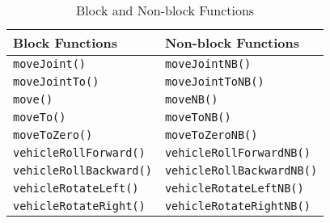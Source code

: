 \begin{center}
\begin{table}[!h]
\caption{Block and Non-block Functions\label{tab:block_nonblock}}
\begin{tabular}{ p{7cm}p{7cm} }\hline
Block Functions & Non-block Functions\\
\hline
\texttt{moveJoint()}            &\texttt{moveJointNB()}\\
\texttt{moveJointTo()}          &\texttt{moveJointToNB()}\\
\texttt{move()}                 &\texttt{moveNB()}\\
\texttt{moveTo()}               &\texttt{moveToNB()}\\
\texttt{moveToZero()}           &\texttt{moveToZeroNB()}\\
\texttt{vehicleRollForward()}      &\texttt{vehicleRollForwardNB()}\\
\texttt{vehicleRollBackward()}     &\texttt{vehicleRollBackwardNB()}\\
\texttt{vehicleRotateLeft()}       &\texttt{vehicleRotateLeftNB()}\\
\texttt{vehicleRotateRight()}      &\texttt{vehicleRotateRightNB()}\\
\hline
\end{tabular}
\end{table}
\end{center}
